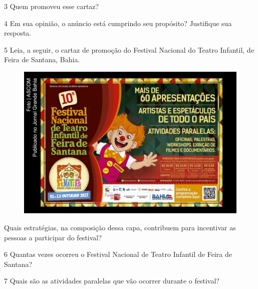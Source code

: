 \num{3} Quem promoveu esse cartaz?


\num{4} Em sua opinião, o anúncio está cumprindo seu propósito? Justifique 
sua resposta.


\pagebreak
\num{5} Leia, a seguir, o cartaz de promoção do Festival Nacional do Teatro
Infantil, de Feira de Santana, Bahia.

\begin{figure}[htpb!]
\includegraphics[width=\textwidth]{media/image15.jpeg}
\end{figure}

Quais estratégias, na composição dessa capa, contribuem para
incentivar as pessoas a participar do festival?


\num{6} Quantas vezes ocorreu o Festival Nacional de Teatro Infantil de
Feira de Santana?


\num{7} Quais são as atividades paralelas que vão ocorrer durante o festival?



